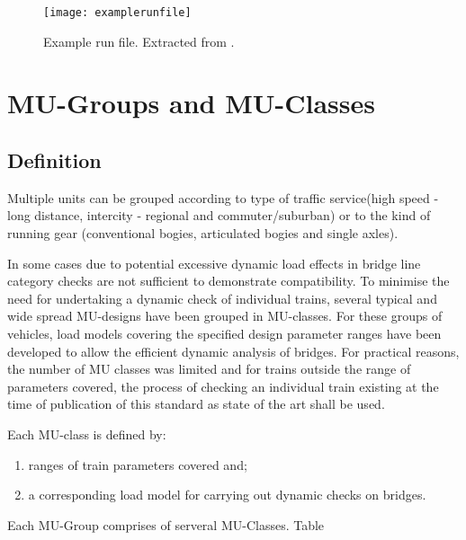 \begin{appendices}
\begin{figure}[h]
    \centering
    \texttt{[image: examplerunfile]}
    \caption{Example run file. Extracted from \citet{d181dt329}.  }
    \label{fig:examplerunfile}
\end{figure}

\chapter{MU-Groups and MU-Classes}\label{app:mu}

\section{Definition}
Multiple units can be grouped according to type of traffic service(high speed - long distance, intercity - regional and commuter/suburban) or to the kind of running gear (conventional bogies, articulated bogies and single axles).


In some cases due to potential excessive dynamic load effects in bridge line category checks are not sufficient to demonstrate compatibility. To minimise the need for undertaking a dynamic check of individual trains, several typical and wide spread MU-designs have been grouped in MU-classes. For these groups of vehicles, load models covering the specified design parameter ranges have been developed to allow the efficient dynamic analysis of bridges. For practical reasons, the number of MU classes was limited and for trains outside the range of parameters covered, the process of checking an individual train existing at the time of publication of this standard as state of the art shall be used.

Each MU-class is defined by:

\begin{enumerate}[-]
\item ranges of train parameters covered and;
\item a corresponding load model for carrying out dynamic checks on bridges.
\end{enumerate}

Each MU-Group comprises of serveral MU-Classes. Table


\end{appendices}
